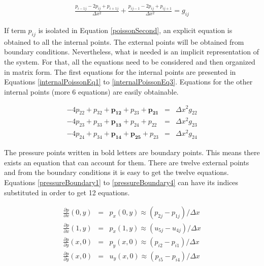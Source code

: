 \documentclass[journal]{IEEEtran}
\begin{document}
\begin{eqnarray}
\frac{p_{i-1j} - 2p_{ij} + p_{i+1j}}{\Delta x^2}	+ \frac{p_{ij-1} - 2p_{ij} + p_{ij+1}}{\Delta x^2} = g_{ij}\label{poissonSecond}
\end{eqnarray}

If term $p_{ij}$ is isolated in Equation \ref{poissonSecond}, an explicit equation is obtained to all the internal points. The external points will be obtained from boundary conditions. Nevertheless, what is needed is an implicit representation of the system. For that, all the equations need to be considered and then organized in matrix form. The first equations for the internal points are presented in Equations \ref{internalPoissonEq1} to \ref{internalPoissonEq3}. Equations for the other internal points (more 6 equations) are easily obtainable.

\begin{eqnarray}
-4p_{22} + p_{32} + \boldsymbol{p_{12}} + p_{23} + \boldsymbol{p_{21}} &=& \Delta x^2 g_{22} \label{internalPoissonEq1}\\
-4p_{23} + p_{33} + \boldsymbol{p_{13}} + p_{24} + p_{22} &=& \Delta x^2 g_{23}\label{internalPoissonEq2}\\
-4p_{24} + p_{34} + \boldsymbol{p_{14}} + \boldsymbol{p_{25}} + p_{23} &=& \Delta x^2 g_{24}\label{internalPoissonEq3}
\end{eqnarray}

The pressure points written in bold letters are boundary points. This means there exists an equation that can account for them. There are twelve external points and from the boundary conditions it is easy to get the twelve equations. Equations \ref{pressureBoundary1} to \ref{pressureBoundary4} can have its indices substituted in order to get 12 equations.

\begin{eqnarray}
\frac{\partial p}{\partial x}\left(0, y\right) &=& p_x\left(0, y\right)  \approx  (p_{2j} - p_{1j})/\Delta x \label{pressureBoundary1}\\
\frac{\partial p}{\partial x}\left(1, y\right) &=& p_x\left(1, y\right)  \approx  (u_{5j} - u_{4j})/\Delta x\\
\frac{\partial p}{\partial y}\left(x, 0\right) &=& p_y\left(x, 0\right)  \approx (p_{i2} - p_{i1})/\Delta x\\
\frac{\partial p}{\partial y}\left(x, 0\right) &=& u_y\left(x, 0\right)  \approx  (p_{i5} - p_{i4})/\Delta x\label{pressureBoundary4}
\end{eqnarray}
\end{document}
